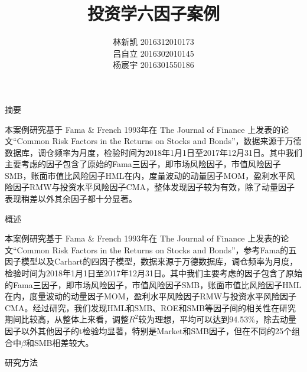 \documentclass[11pt]{article}
\title{\heiti \zihao{1}投资学六因子案例}
\author{\heiti \zihao{5}林新凯 2016312010173\\ \heiti \zihao{5}吕自立 2016302010145\\ \heiti \zihao{5}杨宸宇 2016301550186}
\date{}
\begin{document}
    
    
    \maketitle
    \begin{center}
        \heiti {}摘要
    \end{center}
    \par \indent
    \heiti 本案例研究基于 Fama \& French 1993年在 The Journal of Finance 上发表的论文“Common Risk Factors in the Returns on Stocks and Bonds”，数据来源于万德数据库，调仓频率为月度，检验时间为2018年1月1日至2017年12月31日。其中我们主要考虑的因子包含了原始的Fama三因子，即市场风险因子，市值风险因子SMB，账面市值比风险因子HML在内，度量波动的动量因子MOM，盈利水平风险因子RMW与投资水平风险因子CMA，整体发现因子较为有效，除了动量因子表现稍差以外其余因子都十分显著。\\







    \begin{center}
        \heiti {}概述
    \end{center}
    \par \indent
    \heiti 本案例研究基于 Fama \& French 1993年在 The Journal of Finance 上发表的论文“Common Risk Factors in the Returns on Stocks and Bonds”，参考Fama的五因子模型以及Carhart的四因子模型，数据来源于万德数据库，调仓频率为月度，检验时间为2018年1月1日至2017年12月31日。其中我们主要考虑的因子包含了原始的Fama三因子，即市场风险因子，市值风险因子SMB，账面市值比风险因子HML在内，度量波动的动量因子MOM，盈利水平风险因子RMW与投资水平风险因子CMA。经过研究，我们发现HML和SMB、ROE和SMB等因子间的相关性在研究期间比较高，从整体上来看，调整$R^2$较为理想，平均可以达到94.53\%，除去动量因子以外其他因子的t检验均显著，特别是Market和SMB因子，但在不同的25个组合中$\beta$和SMB相差较大。\\


    \begin{center}
        \heiti {}研究方法
    \end{center}
    
\end{document}
